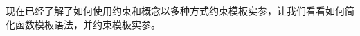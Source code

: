 现在已经了解了如何使用约束和概念以多种方式约束模板实参，让我们看看如何简化函数模板语法，并约束模板实参。




































































